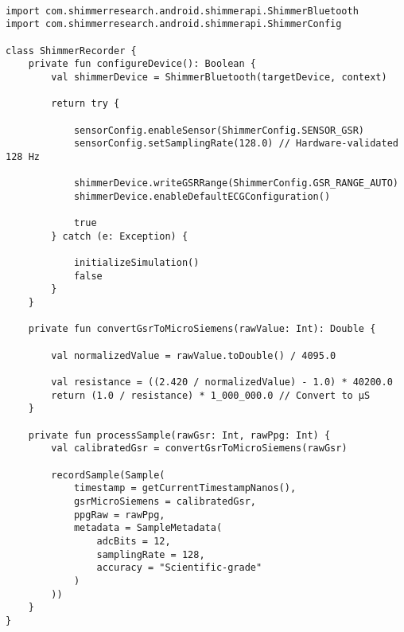 \begin{verbatim}

import com.shimmerresearch.android.shimmerapi.ShimmerBluetooth
import com.shimmerresearch.android.shimmerapi.ShimmerConfig

class ShimmerRecorder {
    private fun configureDevice(): Boolean {
        val shimmerDevice = ShimmerBluetooth(targetDevice, context)

        return try {

            sensorConfig.enableSensor(ShimmerConfig.SENSOR_GSR)
            sensorConfig.setSamplingRate(128.0) // Hardware-validated 128 Hz

            shimmerDevice.writeGSRRange(ShimmerConfig.GSR_RANGE_AUTO)
            shimmerDevice.enableDefaultECGConfiguration()

            true
        } catch (e: Exception) {

            initializeSimulation()
            false
        }
    }

    private fun convertGsrToMicroSiemens(rawValue: Int): Double {

        val normalizedValue = rawValue.toDouble() / 4095.0

        val resistance = ((2.420 / normalizedValue) - 1.0) * 40200.0
        return (1.0 / resistance) * 1_000_000.0 // Convert to µS
    }

    private fun processSample(rawGsr: Int, rawPpg: Int) {
        val calibratedGsr = convertGsrToMicroSiemens(rawGsr)

        recordSample(Sample(
            timestamp = getCurrentTimestampNanos(),
            gsrMicroSiemens = calibratedGsr,
            ppgRaw = rawPpg,
            metadata = SampleMetadata(
                adcBits = 12,
                samplingRate = 128,
                accuracy = "Scientific-grade"
            )
        ))
    }
}
\end{verbatim}
